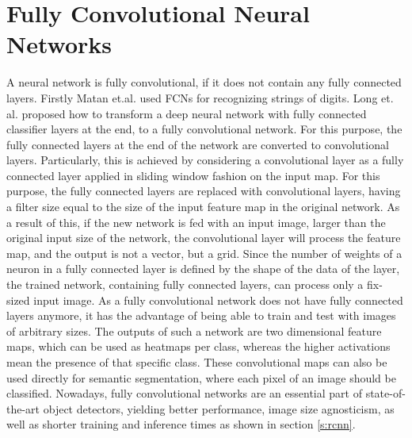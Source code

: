 \section{Fully Convolutional Neural Networks}\label{s:fullyconvnet}
A neural network is fully convolutional, if it does not contain any fully connected layers. Firstly Matan et.al. \cite{Matan92multi-digitrecognition} used FCNs for recognizing strings of digits. Long et. al. \cite{DBLP:journals/corr/LongSD14} proposed how to transform a deep neural network with fully connected classifier layers at the end, to a fully convolutional network. For this purpose, the fully connected layers at the end of the network are converted to convolutional layers. Particularly, this is achieved by considering a convolutional layer as a fully connected layer applied in sliding window fashion on the input map. For this purpose, the fully connected layers are replaced with convolutional layers, having a filter size equal to the size of the input feature map in the original network. As a result of this, if the new network is fed with an input image, larger than the original input size of the network, the convolutional layer will process the feature map, and the output is not a vector, but a grid.
\bigbreak
Since the number of weights of a neuron in a fully connected layer is defined by the shape of the data of the layer, the trained network, containing fully connected layers, can process only a fix-sized input image. As a fully convolutional network does not have fully connected layers anymore, it has the advantage of being able to train and test with images of arbitrary sizes.
\bigbreak
The outputs of such a network are two dimensional feature maps, which can be used as heatmaps per class, whereas the higher activations mean the presence of that specific class. These convolutional maps can also be used directly for semantic segmentation, where each pixel of an image should be classified.
Nowadays, fully convolutional networks are an essential part of state-of-the-art object detectors, yielding better performance, image size agnosticism, as well as shorter training and inference times as shown in section \ref{s:rcnn}.
\bigbreak
